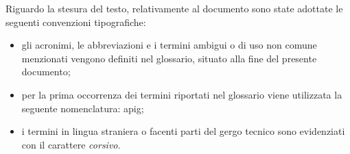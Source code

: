 Riguardo la stesura del testo, relativamente al documento sono state adottate le seguenti convenzioni tipografiche:
\begin{itemize}
	\item gli acronimi, le abbreviazioni e i termini ambigui o di uso non comune menzionati vengono definiti nel glossario, situato alla fine del presente documento;
	\item per la prima occorrenza dei termini riportati nel glossario viene utilizzata la seguente nomenclatura: \gls{apig};
	\item i termini in lingua straniera o facenti parti del gergo tecnico sono evidenziati con il carattere \textit{corsivo}.
\end{itemize}



\newpage